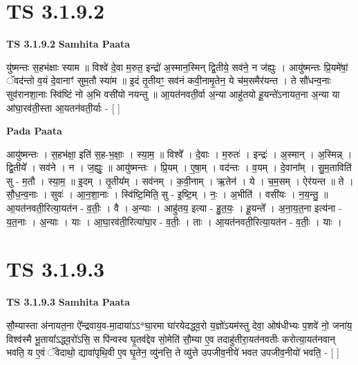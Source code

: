 \documentclass[17pt]{extarticle}
\begin{document}

\section{ TS 3.1.9.2 }

\textbf{TS 3.1.9.2 } \newline
\textbf{Samhita Paata} \newline

यु॑ष्मन्तः स॒हभ॑क्षाः स्याम ॥ विश्वे॑ दे॒वा म॒रुत॒ इन्द्रो॑ अ॒स्मान॒स्मिन् द्वि॒तीये॒ सव॑ने॒ न ज॑ह्युः । आयु॑ष्मन्तः प्रि॒यमे॑षां॒ ॅवद॑न्तो व॒यं दे॒वानाꣳ॑ सुम॒तौ स्या॑म ॥ इ॒दं तृ॒तीयꣳ॒॒ सव॑नं कवी॒नामृ॒तेन॒ ये च॑म॒समैर॑यन्त । ते सौ॑धन्व॒नाः सुव॑रानशा॒नाः स्वि॑ष्टिं नो अ॒भि वसी॑यो नयन्तु ॥ आ॒यत॑नवती॒र्वा अ॒न्या आहु॑तयो हू॒यन्ते॑ऽनायत॒ना अ॒न्या या आ॑घा॒रव॑ती॒स्ता आ॒यतन॑वती॒र्याः - [  ] \newline

\textbf{Pada Paata} \newline

आयु॑ष्मन्तः । स॒हभ॑क्षा॒ इति॑ स॒ह-भ॒क्षाः॒ । स्या॒म॒ ॥ विश्वे᳚ । दे॒वाः । म॒रुतः॑ । इन्द्रः॑ । अ॒स्मान् । अ॒स्मिन्न् । द्वि॒तीये᳚ । सव॑ने । न । ज॒ह्युः॒ ॥ आयु॑ष्मन्तः । प्रि॒यम् । ए॒षा॒म् । वद॑न्तः । व॒यम् । दे॒वाना᳚म् । सु॒म॒ताविति॑ सु - म॒तौ । स्या॒म॒ ॥ इ॒दम् । तृ॒तीय᳚म् । सव॑नम् । क॒वी॒नाम् । ऋ॒तेन॑ । ये । च॒म॒सम् । ऐर॑यन्त ॥ ते । सौ॒ध॒न्व॒नाः । सुवः॑ । आ॒न॒शा॒नाः । स्वि॑ष्टि॒मिति॒ सु - इ॒ष्टि॒म् । नः॒ । अ॒भीति॑ । वसी॑यः । न॒य॒न्तु॒ ॥ आ॒यत॑नवती॒रित्या॒यत॑न - व॒तीः॒ । वै । अ॒न्याः । आहु॑तय॒ इत्या - हु॒त॒यः॒ । हू॒यन्ते᳚ । अ॒ना॒य॒त॒ना इत्य॑ना - य॒त॒नाः । अ॒न्याः । याः । आ॒घा॒रव॑ती॒रित्या॑घा॒र - व॒तीः॒ । ताः । आ॒यत॑नवती॒रित्या॒यत॑न - व॒तीः॒ । याः ।  \newline





\section{ TS 3.1.9.3 }

\textbf{TS 3.1.9.3 } \newline
\textbf{Samhita Paata} \newline

सौ॒म्यास्ता अ॑नायत॒ना ऐ᳚न्द्रवाय॒व-मा॒दाया॑ऽऽ*घा॒रमा घा॑रयेदद्ध्व॒रो य॒ज्ञो॑ऽयम॑स्तु देवा॒ ओष॑धीभ्यः प॒शवे॑ नो॒ जना॑य॒ विश्व॑स्मै भू॒ताया᳚ऽद्ध्व॒रो॑ऽसि॒ स पि॑न्वस्व घृ॒तव॑द्देव सो॒मेति॑ सौ॒म्या ए॒व तदाहु॑तीरा॒यत॑नवतीः करोत्या॒यत॑नवान् भवति॒ य ए॒वं ॅवेदाथो॒ द्यावा॑पृथि॒वी ए॒व घृ॒तेन॒ व्यु॑नत्ति॒ ते व्यु॑त्ते उपजीव॒नीये॑ भवत उपजीव॒नीयो॑ भवति॒ - [  ] \newline
\end{document}
